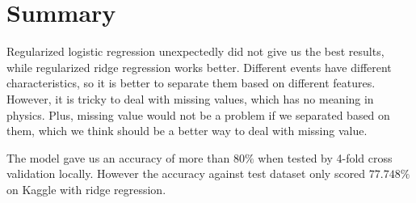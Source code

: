 \documentclass[10pt,conference,compsocconf]{IEEEtran}
\begin{document}







\section{Summary}
Regularized logistic regression unexpectedly did not give us the best results, while regularized ridge regression works better. Different events have different characteristics, so it is better to separate them based on different features. However, it is tricky to deal with missing values, which has no meaning in physics. Plus, missing value would not be a problem if we separated based on them, which we think should be a better way to deal with missing value.

The model gave us an accuracy of more than $80\%$ when tested by 4-fold cross validation locally. However the accuracy against test dataset only scored $77.748\%$ on Kaggle with ridge regression.




\end{document}
